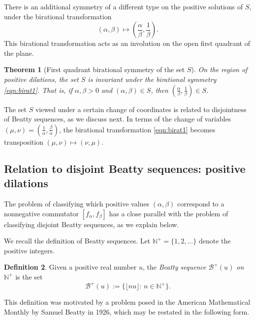 \documentclass[11pt, letterpaper, reqno]{amsart}
\newtheorem{thm}{Theorem}[section]
\theoremstyle{definition}
\newtheorem{defi}[thm]{Definition}
\numberwithin{equation}{section}
\newcommand{\NN}{\mathbb{N}}
\newcommand{\sB}{\mathcal{B}}
\newcommand{\floor}[1]{\lfloor{#1}\rfloor}
\newcommand{\um}{{\mu}}
\newcommand{\vm}{{\nu}}
\begin{document}
There is an additional symmetry of a different type on the positive solutions of $S$,
under the birational transformation 
\begin{equation}\label{eqn:birat1}
(\alpha, \beta) \mapsto \left( \frac{\alpha}{\beta}, \frac{1}{\beta} \right).
\end{equation}
This  birational  transformation acts as an involution on the open first quadrant of the plane.

%
%
\begin{thm}[First quadrant birational symmetry of the set $S$]
\label{thm:symmetries2}
On the region of  positive dilations,
the  set $S$ is invariant under the birational symmetry \eqref{eqn:birat1}.
That is, if  $\alpha, \beta >0$ and $(\alpha, \beta) \in S$, then 
$( \frac{\alpha}{\beta}, \frac{1}{\beta}) \in S$.
\end{thm}

The set $S$ viewed under a certain change of coordinates is related to disjointness of Beatty sequences, 
as we  discuss next. 
In terms of the change of variables 
$(\um,\vm)= (\frac{1}{\alpha}, \frac{\beta}{\alpha})$, 
the birational transformation \eqref{eqn:birat1}
becomes transposition $(\um,\vm) \mapsto (\vm,\um)$.


%
%
\subsection{Relation to disjoint Beatty sequences: positive dilations}
\label{subsec:beatty}
The  problem of classifying  which positive values $(\alpha, \beta)$ correspond to
a nonnegative commutator $[f_\alpha,f_\beta]$ has  a  close parallel with
the problem of classifying disjoint Beatty sequences, as we explain below. 

We recall the definition of Beatty sequences.
Let $\NN^{+} = \{1,2,\ldots\}$ denote the positive integers. 

\begin{defi}\label{def:44}
Given a positive real number $u$, the {\em Beatty sequence $\sB^{+}(u)$ on $\NN^{+}$} 
 is the set
\[
\sB^{+}(u) := \{ \floor{ n u }: \,  n \in \NN^+\} .
\]
\end{defi}

This definition was motivated by  a problem posed
in the American Mathematical  Monthly 
by Samuel Beatty \cite{Bea26} in 1926, which may be restated in the following form.
\end{document}
